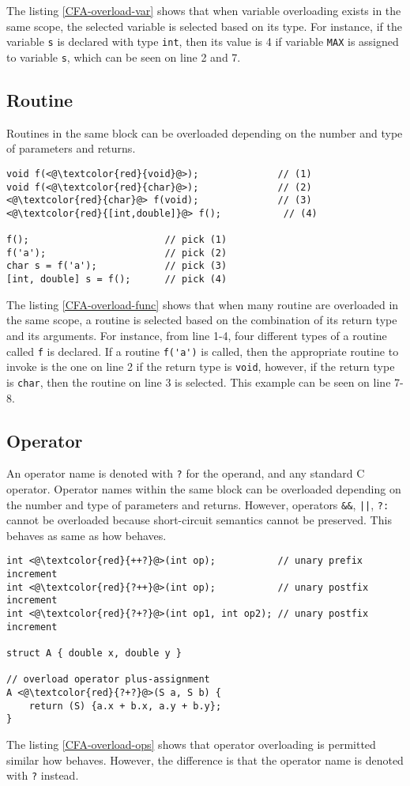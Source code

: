 The listing \ref{CFA-overload-var} shows that when variable overloading exists
in the same scope, the selected variable is selected based on its type. For
instance, if the variable \verb|s| is declared with type \verb|int|, then its
value is 4 if variable \verb|MAX| is assigned to variable \verb|s|, which can
be seen on line 2 and 7.

\subsection{Routine}
Routines in the same block can be overloaded depending on the number and type of
parameters and returns.


\begin{lstlisting}[caption={Overloading routines in \CFA},
label={CFA-overload-func}]
void f(<@\textcolor{red}{void}@>);              // (1)
void f(<@\textcolor{red}{char}@>);              // (2)
<@\textcolor{red}{char}@> f(void);              // (3)
<@\textcolor{red}{[int,double]}@> f();           // (4)

f();                        // pick (1)
f('a');                     // pick (2)
char s = f('a');            // pick (3)
[int, double] s = f();      // pick (4)
\end{lstlisting}

The listing \ref{CFA-overload-func} shows that when many routine are overloaded in
the same scope, a routine is selected based on the combination of its return type and its
arguments. For instance, from line 1-4, four different types of a routine called
\verb|f| is declared. If a routine \verb|f('a')| is called, then the appropriate
routine to invoke is the one on line 2 if the return type is \verb|void|, however, if
the return type is \verb|char|, then the routine on line 3 is selected. This
example can be seen on line 7-8.

\subsection{Operator}
An operator name is denoted with \verb|?| for the operand, and any standard C
operator. Operator names within the same block can be overloaded depending on
the number and type of parameters and returns. However, operators \verb|&&|,
\verb-||-, \verb|?:| cannot be overloaded because short-circuit semantics
cannot be preserved. This behaves as same as how \CCS behaves.


\begin{lstlisting}[caption={Overloading operators in \CFA},
label={CFA-overload-ops}]
int <@\textcolor{red}{++?}@>(int op);           // unary prefix increment
int <@\textcolor{red}{?++}@>(int op);           // unary postfix increment
int <@\textcolor{red}{?+?}@>(int op1, int op2); // unary postfix increment

struct A { double x, double y }

// overload operator plus-assignment
A <@\textcolor{red}{?+?}@>(S a, S b) {
    return (S) {a.x + b.x, a.y + b.y};
}
\end{lstlisting}

The listing \ref{CFA-overload-ops} shows that operator overloading is permitted
similar how \CCS behaves. However, the difference is that the operator name is
denoted with \verb|?| instead.

